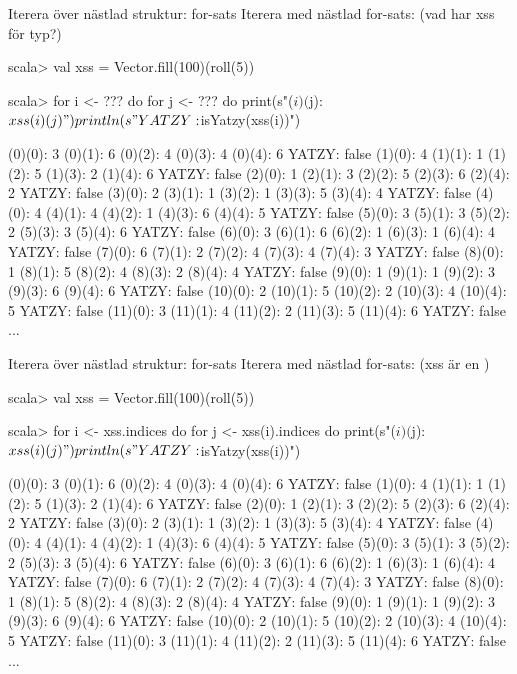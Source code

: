 \begin{Slide}{Iterera över nästlad struktur: for-sats}\SlideFontSmall
Iterera med nästlad for-sats: (vad har xss för typ?)
\begin{REPL}
scala> val xss = Vector.fill(100)(roll(5))

scala> for i <- ??? do 
         for j <- ??? do
           print(s"($i)($j): ${xss(i)(j)} ")
         println(s" YATZY: ${isYatzy(xss(i))}")

(0)(0): 3 (0)(1): 6 (0)(2): 4 (0)(3): 4 (0)(4): 6  YATZY: false
(1)(0): 4 (1)(1): 1 (1)(2): 5 (1)(3): 2 (1)(4): 6  YATZY: false
(2)(0): 1 (2)(1): 3 (2)(2): 5 (2)(3): 6 (2)(4): 2  YATZY: false
(3)(0): 2 (3)(1): 1 (3)(2): 1 (3)(3): 5 (3)(4): 4  YATZY: false
(4)(0): 4 (4)(1): 4 (4)(2): 1 (4)(3): 6 (4)(4): 5  YATZY: false
(5)(0): 3 (5)(1): 3 (5)(2): 2 (5)(3): 3 (5)(4): 6  YATZY: false
(6)(0): 3 (6)(1): 6 (6)(2): 1 (6)(3): 1 (6)(4): 4  YATZY: false
(7)(0): 6 (7)(1): 2 (7)(2): 4 (7)(3): 4 (7)(4): 3  YATZY: false
(8)(0): 1 (8)(1): 5 (8)(2): 4 (8)(3): 2 (8)(4): 4  YATZY: false
(9)(0): 1 (9)(1): 1 (9)(2): 3 (9)(3): 6 (9)(4): 6  YATZY: false
(10)(0): 2 (10)(1): 5 (10)(2): 2 (10)(3): 4 (10)(4): 5  YATZY: false
(11)(0): 3 (11)(1): 4 (11)(2): 2 (11)(3): 5 (11)(4): 6  YATZY: false
...
\end{REPL}
\end{Slide}

\begin{Slide}{Iterera över nästlad struktur: for-sats}\SlideFontSmall
Iterera med nästlad for-sats: (xss är en )
\begin{REPL}
scala> val xss = Vector.fill(100)(roll(5))

scala> for i <- xss.indices do 
         for j <- xss(i).indices do
           print(s"($i)($j): ${xss(i)(j)} ")
         println(s" YATZY: ${isYatzy(xss(i))}")

(0)(0): 3 (0)(1): 6 (0)(2): 4 (0)(3): 4 (0)(4): 6  YATZY: false
(1)(0): 4 (1)(1): 1 (1)(2): 5 (1)(3): 2 (1)(4): 6  YATZY: false
(2)(0): 1 (2)(1): 3 (2)(2): 5 (2)(3): 6 (2)(4): 2  YATZY: false
(3)(0): 2 (3)(1): 1 (3)(2): 1 (3)(3): 5 (3)(4): 4  YATZY: false
(4)(0): 4 (4)(1): 4 (4)(2): 1 (4)(3): 6 (4)(4): 5  YATZY: false
(5)(0): 3 (5)(1): 3 (5)(2): 2 (5)(3): 3 (5)(4): 6  YATZY: false
(6)(0): 3 (6)(1): 6 (6)(2): 1 (6)(3): 1 (6)(4): 4  YATZY: false
(7)(0): 6 (7)(1): 2 (7)(2): 4 (7)(3): 4 (7)(4): 3  YATZY: false
(8)(0): 1 (8)(1): 5 (8)(2): 4 (8)(3): 2 (8)(4): 4  YATZY: false
(9)(0): 1 (9)(1): 1 (9)(2): 3 (9)(3): 6 (9)(4): 6  YATZY: false
(10)(0): 2 (10)(1): 5 (10)(2): 2 (10)(3): 4 (10)(4): 5  YATZY: false
(11)(0): 3 (11)(1): 4 (11)(2): 2 (11)(3): 5 (11)(4): 6  YATZY: false
...
\end{REPL}
\end{Slide}


